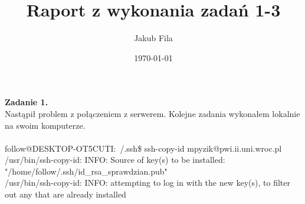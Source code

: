\documentclass[a4paper]{article}
\author{Jakub Fila}
\title{Raport z wykonania zadań 1-3}
\date{\today}
\begin{document}
\maketitle
\noindent
{\bf Zadanie 1.} \\
\noindent
Nastąpił problem z połączeniem z serwerem. Kolejne zadania wykonałem lokalnie na swoim komputerze. \\ \\
follow@DESKTOP-OT5CUTI:~/.ssh\$ ssh-copy-id mpyzik@pwi.ii.uni.wroc.pl \\
/usr/bin/ssh-copy-id: INFO: Source of key(s) to be installed: "/home/follow/.ssh/id\_rsa\_sprawdzian.pub" \\ 

/usr/bin/ssh-copy-id: INFO: attempting to log in with the new key(s), to filter out any that are already installed \\
\end{document}
